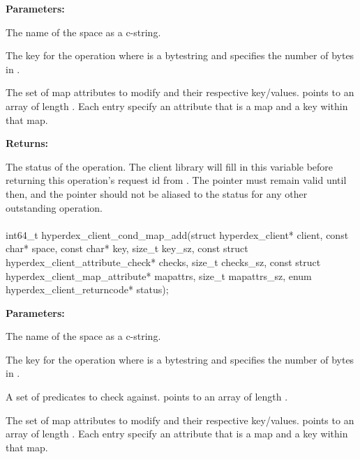 \noindent\textbf{Parameters:}
\begin{description}[labelindent=\widthof{{\code{mapattrs}, \code{mapattrs\_sz}}},leftmargin=*,noitemsep,nolistsep,align=right]
\item[\code{space}] The name of the space as a c-string.
\item[\code{key}, \code{key\_sz}] The key for the operation where  is a bytestring and  specifies the number of bytes in .
\item[\code{mapattrs}, \code{mapattrs\_sz}] The set of map attributes to modify and their respective key/values.   points to an array of length .  Each entry specify an attribute that is a map and a key within that map.
\end{description}

\noindent\textbf{Returns:}
\begin{description}[labelindent=\widthof{{\code{status}}},leftmargin=*,noitemsep,nolistsep,align=right]
\item[\code{status}] The status of the operation.  The client library will fill in this variable before returning this operation's request id from .  The pointer must remain valid until then, and the pointer should not be aliased to the status for any other outstanding operation.
\end{description}

\paragraph{}
\label{api:c:cond_map_add}
\begin{ccode}
int64_t hyperdex_client_cond_map_add(struct hyperdex_client* client,
        const char* space,
        const char* key, size_t key_sz,
        const struct hyperdex_client_attribute_check* checks, size_t checks_sz,
        const struct hyperdex_client_map_attribute* mapattrs, size_t mapattrs_sz,
        enum hyperdex_client_returncode* status);
\end{ccode}
\funcdesc 

\noindent\textbf{Parameters:}
\begin{description}[labelindent=\widthof{{\code{mapattrs}, \code{mapattrs\_sz}}},leftmargin=*,noitemsep,nolistsep,align=right]
\item[\code{space}] The name of the space as a c-string.
\item[\code{key}, \code{key\_sz}] The key for the operation where  is a bytestring and  specifies the number of bytes in .
\item[\code{checks}, \code{checks\_sz}] A set of predicates to check against.   points to an array of length .
\item[\code{mapattrs}, \code{mapattrs\_sz}] The set of map attributes to modify and their respective key/values.   points to an array of length .  Each entry specify an attribute that is a map and a key within that map.
\end{description}

